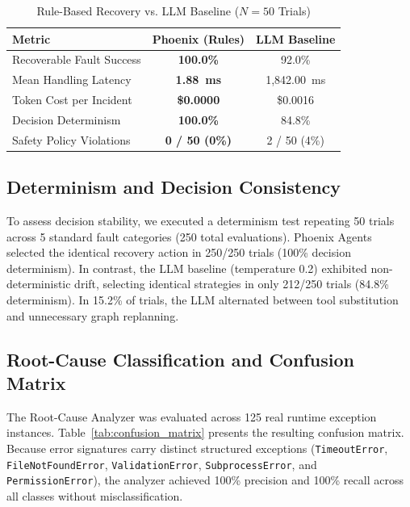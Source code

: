 \documentclass[conference]{IEEEtran}
\begin{document}
\begin{table}[t]
\centering
\caption{Rule-Based Recovery vs. LLM Baseline ($N=50$ Trials)}
\label{tab:llm_baseline}
\footnotesize
\renewcommand{\arraystretch}{1.05}
\setlength{\tabcolsep}{3pt}
\begin{tabularx}{\columnwidth}{|X|cc|}
\hline
\textbf{Metric} & \textbf{Phoenix (Rules)} & \textbf{LLM Baseline} \\
\hline
Recoverable Fault Success & \textbf{100.0\%} & 92.0\% \\
Mean Handling Latency & \textbf{1.88~ms} & 1,842.00~ms \\
Token Cost per Incident & \textbf{\$0.0000} & \$0.0016 \\
Decision Determinism & \textbf{100.0\%} & 84.8\% \\
Safety Policy Violations & \textbf{0 / 50 (0\%)} & 2 / 50 (4\%) \\
\hline
\end{tabularx}
\end{table}

\subsection{Determinism and Decision Consistency}
To assess decision stability, we executed a determinism test repeating 50 trials across 5 standard fault categories (250 total evaluations). Phoenix Agents selected the identical recovery action in 250/250 trials (100\% decision determinism). In contrast, the LLM baseline (temperature 0.2) exhibited non-deterministic drift, selecting identical strategies in only 212/250 trials (84.8\% determinism). In 15.2\% of trials, the LLM alternated between tool substitution and unnecessary graph replanning.

\subsection{Root-Cause Classification and Confusion Matrix}
The Root-Cause Analyzer was evaluated across 125 real runtime exception instances. Table~\ref{tab:confusion_matrix} presents the resulting confusion matrix. Because error signatures carry distinct structured exceptions (\texttt{TimeoutError}, \texttt{FileNotFoundError}, \texttt{ValidationError}, \texttt{SubprocessError}, and \texttt{PermissionError}), the analyzer achieved 100\% precision and 100\% recall across all classes without misclassification.
\end{document}
